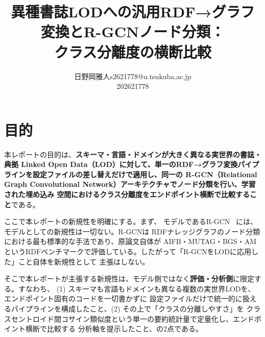 \documentclass[dvipdfmx,twoside,11pt]{article}
\makeatletter
\newcommand\studentName{日野岡雅人}                  %
\newcommand\studentEmail{s2621778@u.tsukuba.ac.jp}          %
\newcommand\studentNumber{202621778}                %
\newcommand{\repourl}{\href{https://github.com/terasaki-8910/MLPR_final_report.git}{{\ttfamily\scriptsize https://github.com/terasaki-8910/MLPR\_final\_report.git}}}
\makeatother
\begin{document}
    \title{異種書誌LODへの汎用RDF→グラフ変換とR-GCNノード分類：\\クラス分離度の横断比較}

    \author{\name \studentName \email \studentEmail \\
    \studentNumber
    \addr
    }


    \maketitle

\makeatletter
\def\@oddfoot{{\repourl}\hfil{\rm\thepage}}%
\def\@evenfoot{{\rm\thepage}\hfil{\repourl}}%
\makeatother

\section{目的}
\label{sec:purpose}

本レポートの目的は、\textbf{スキーマ・言語・ドメインが大きく異なる実世界の書誌・典拠 Linked Open
Data（LOD）に対して、単一のRDF→グラフ変換パイプラインを設定ファイルの差し替えだけで適用し、同一の
R-GCN（Relational Graph Convolutional Network）アーキテクチャでノード分類を行い、学習された埋め込み
空間におけるクラス分離度をエンドポイント横断で比較すること}である。

ここで本レポートの新規性を明確にする。まず、
モデルであるR-GCN~\citep{schlichtkrull2018modeling} には、モデルとしての新規性は一切ない。R-GCNは
RDFナレッジグラフのノード分類における最も標準的な手法であり、原論文自体が AIFB・MUTAG・BGS・AM
というRDFベンチマークで評価している。したがって「R-GCNをLODに応用した」こと自体を新規性として
主張はしない。

そこで本レポートが主張する新規性は、モデル側ではなく\textbf{評価・分析側}に限定する。すなわち、
(1) スキーマも言語もドメインも異なる複数の実世界LODを、エンドポイント固有のコードを一切書かずに
設定ファイルだけで統一的に扱えるパイプラインを構成したこと、(2) その上で「クラスの分離しやすさ」を
クラスセントロイド間コサイン類似度という単一の要約統計量で定量化し、エンドポイント横断で比較する
分析軸を提示したこと、の2点である。
\end{document}
